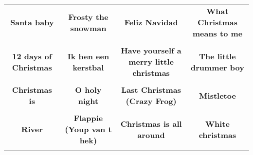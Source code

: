 \documentclass[12pt]{article} \usepackage{eso-pic, graphicx}
\newcommand{\background}[1]{%
\AddToShipoutPictureBG*{\texttt{[image: \#1]}}
}
\begin{document}
\tabcolsep=30.2pt \renewcommand{\arraystretch}{4.5}   \vspace*{4.3cm} \begin{center}  \begin{tabular}{c c c c}
\parbox{3cm}{\centering \textbf{Santa baby}}& 
\parbox{3cm}{\centering \textbf{Frosty the snowman}}& 
\parbox{3cm}{\centering \textbf{Feliz Navidad}}& 
\parbox{3cm}{\centering \textbf{What Christmas means to me}}\\ \\ 
\parbox{3cm}{\centering \textbf{12 days of Christmas}}& 
\parbox{3cm}{\centering \textbf{Ik ben een kerstbal}}& 
\parbox{3cm}{\centering \textbf{Have yourself a merry little christmas}}& 
\parbox{3cm}{\centering \textbf{The little drummer boy}}\\ \\ 
\parbox{3cm}{\centering \textbf{Christmas is}}& 
\parbox{3cm}{\centering \textbf{O holy night}}& 
\parbox{3cm}{\centering \textbf{Last Christmas (Crazy Frog)}}& 
\parbox{3cm}{\centering \textbf{Mistletoe}}\\ \\ 
\parbox{3cm}{\centering \textbf{River}}& 
\parbox{3cm}{\centering \textbf{Flappie (Youp van t hek)}}& 
\parbox{3cm}{\centering \textbf{Christmas is all around}}& 
\parbox{3cm}{\centering \textbf{White christmas}}\\ \\ 
\end{tabular} \background{discobingo.pdf} \end{center} 
\end{document}
